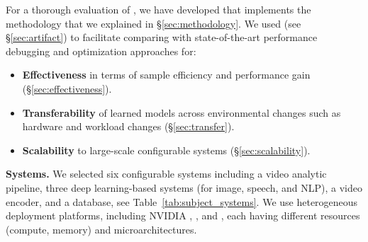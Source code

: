 For a thorough evaluation of \ourapproach, we have developed \ourtool that implements the methodology that we explained in \S\ref{sec:methodology}.
We used \ourtool (see \S\ref{sec:artifact}) to facilitate comparing \ourapproach with state-of-the-art performance debugging and optimization approaches for: 
\begin{itemize}
\item \textbf{Effectiveness} in terms of sample efficiency and performance gain (\S\ref{sec:effectiveness}).
\item \textbf{Transferability} of learned models across environmental changes such as hardware and workload changes (\S\ref{sec:transfer}).
\item \textbf{Scalability} to large-scale configurable systems (\S\ref{sec:scalability}).
\end{itemize}





\noindent
\textbf{Systems.} We selected six configurable systems including a video analytic pipeline, three deep learning-based systems (for image, speech, and NLP), a video encoder, and a database, see Table~\ref{tab:subject_systems}. We use heterogeneous deployment platforms, including \textsc{NVIDIA} \txone, \txtwo, and \xavier, each having different resources (compute, memory) and microarchitectures. 

